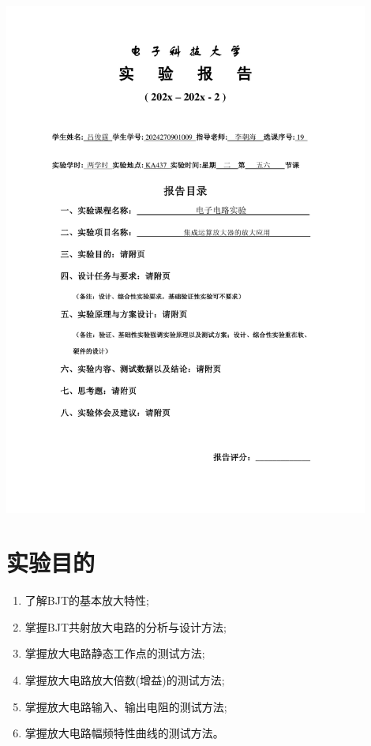 \documentclass[10pt, a4paper]{article} %
\begin{document}
\begin{titlepage}
    \centering
    \includegraphics[page=1, width=0.9\textwidth, keepaspectratio]{image/实验报告撰写封面.pdf}
    \restoregeometry
\end{titlepage}

\setcounter{section}{2}

\section{实验目的}

\begin{enumerate}[leftmargin=50pt,label=(\arabic*)] %
    \item 了解BJT的基本放大特性;
    \item 掌握BJT共射放大电路的分析与设计方法;
    \item 掌握放大电路静态工作点的测试方法;
    \item 掌握放大电路放大倍数(增益)的测试方法;
    \item 掌握放大电路输入、输出电阻的测试方法;
    \item 掌握放大电路幅频特性曲线的测试方法。
\end{enumerate}
\end{document}
